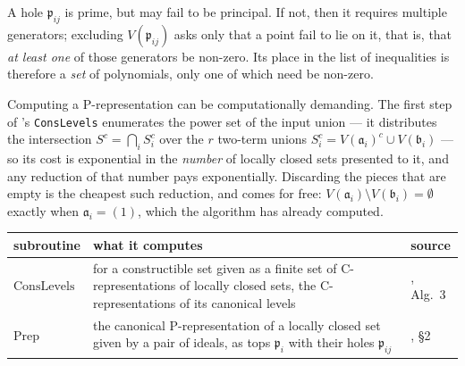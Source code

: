 \documentclass{article}
\theoremstyle{definition}
\theoremstyle{plain}
\begin{document}
A hole
$\mathfrak{p}_{ij}$ is prime, but may fail to be principal.  If not, then it requires multiple generators; excluding
$V(\mathfrak{p}_{ij})$ asks only that a point fail to lie on it, that is, that {\it at least
one} of those generators be non-zero.  Its place in the list of inequalities is therefore a
{\it set} of polynomials, only one of which need be non-zero.

Computing a P-representation can be computationally demanding.  The first step of
\cite{BrunatMontes}'s {\tt ConsLevels} enumerates the power set of the input union ---
it distributes the intersection $S^c = \bigcap_i S_i^c$ over the $r$ two-term unions
$S_i^c = V(\mathfrak{a}_i)^c \cup V(\mathfrak{b}_i)$ --- so its cost is exponential in
the {\it number} of locally closed sets presented to it, and any reduction of that
number pays exponentially.  Discarding the pieces that are empty is the cheapest such
reduction, and comes for free: $V(\mathfrak{a}_i) \setminus V(\mathfrak{b}_i) = \emptyset$
exactly when $\mathfrak{a}_i = (1)$, which the algorithm has already computed.

\begin{center}
\small
\begin{tabularx}{\textwidth}{@{}lXl@{}}
\hline
subroutine & what it computes & source \\
\hline
$\mathrm{ConsLevels}$
  & for a constructible set given as a finite set of C-representations of locally
    closed sets, the C-representations of its canonical levels
  & \cite{BrunatMontes}, Alg.~3 \\[3pt]
$\mathrm{Prep}$
  & the canonical P-representation of a locally closed set given by a pair of
    ideals, as tops $\mathfrak{p}_i$ with their holes $\mathfrak{p}_{ij}$
  & \cite{BrunatMontes}, \S2 \\[3pt]
\hline
\end{tabularx}
\end{center}
\end{document}
